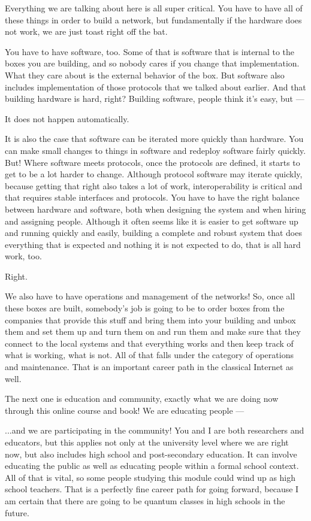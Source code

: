 \rrr Everything we are talking about here is all super critical. You have to have all of these things in order to build a network, but fundamentally if the hardware does not work, we are just toast right off the bat.

You have to have software, too. Some of that is software that is internal to the boxes you are building, and so nobody cares if you change that implementation. What they care about is the external behavior of the box. But software also includes implementation of those protocols that we talked about earlier. And that building hardware is hard, right? Building software, people think it's easy, but ---

\mmm It does not happen automatically.

\rrr It is also the case that software can be iterated more quickly than hardware. You can make small changes to things in software and redeploy software fairly quickly. But! Where software meets protocols, once the protocols are defined, it starts to get to be a lot harder to change. Although protocol software may iterate quickly, because getting that right also takes a lot of work, interoperability is critical and that requires stable interfaces and protocols. You have to have the right balance between hardware and software, both when designing the system and when hiring and assigning people. Although it often seems like it is easier to get software up and running quickly and easily, building a complete and robust system that does everything that is expected and nothing it is not expected to do, that is all hard work, too.

\mmm Right.

\rrr We also have to have operations and management of the networks! So, once all these boxes are built, somebody's job is going to be to order boxes from the companies that provide this stuff and bring them into your building and unbox them and set them up and turn them on and run them and make sure that they connect to the local systems and that everything works and then keep track of what is working, what is not. All of that falls under the category of operations and maintenance. That is an important career path in the classical Internet as well.

\mmm The next one is education and community, exactly what we are doing now through this online course and book! We are educating people ---

\rrr ...and we are participating in the community! You and I are both researchers and educators, but this applies not only at the university level where we are right now, but also includes high school and post-secondary education. It can involve educating the public as well as educating people within a formal school context. All of that is vital, so some people studying this module could wind up as high school teachers. That is a perfectly fine career path for going forward, because I am certain that there are going to be quantum classes in high schools in the future.

